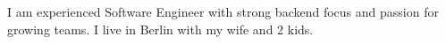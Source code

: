 \documentclass[8pt]{developercv} %
\begin{document}
\vspace{0.5cm}



\begin{minipage}[t]{0.4\textwidth} %
	\vspace{-\baselineskip} %
	
	{I am experienced Software Engineer with strong backend focus and passion for growing teams. I live in Berlin with my wife and 2 kids.  }
\end{minipage}
\hfill %
\begin{minipage}[t]{0.5\textwidth} %
	\vspace{-\baselineskip} %
	\begin{barchart}{5.5}
	\end{barchart}
\end{minipage}

\begin{center}
\end{center}


\end{document}
